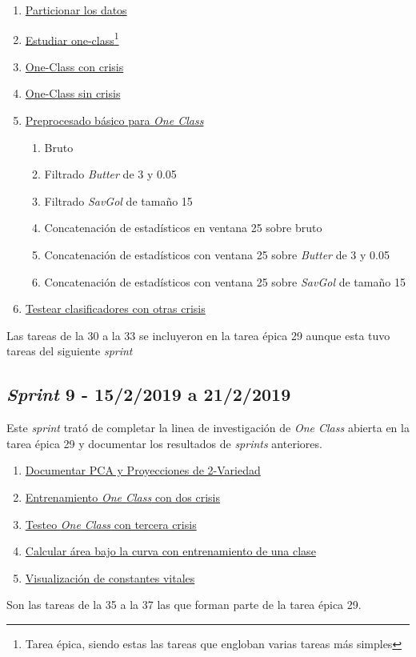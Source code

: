 \begin{enumerate}\addtocounter{enumi}{27}
	\item \href{https://github.com/joselucross/TFG-SmartBeds/issues/28}{Particionar los datos}
	\item \href{https://github.com/joselucross/TFG-SmartBeds/issues/29}{Estudiar one-class\footnote{Tarea épica, siendo estas las tareas que engloban varias tareas más simples}}
	\item \href{https://github.com/joselucross/TFG-SmartBeds/issues/30}{One-Class con crisis}
	\item \href{https://github.com/joselucross/TFG-SmartBeds/issues/31}{One-Class sin crisis}
	\item \href{https://github.com/joselucross/TFG-SmartBeds/issues/32}{Preprocesado básico para \textit{One Class}}
	\begin{enumerate}
		\item Bruto
		\item Filtrado \textit{Butter} de 3 y 0.05
		\item Filtrado \textit{SavGol} de tamaño 15
		\item Concatenación de estadísticos en ventana 25 sobre bruto
		\item Concatenación de estadísticos con ventana 25 sobre \textit{Butter} de 3 y 0.05
		\item Concatenación de estadísticos con ventana 25 sobre \textit{SavGol} de tamaño 15
	\end{enumerate}
	\item \href{https://github.com/joselucross/TFG-SmartBeds/issues/33}{Testear clasificadores con otras crisis}
\end{enumerate}
Las tareas de la 30 a la 33 se incluyeron en la tarea épica 29 aunque esta tuvo tareas del siguiente \textit{sprint}

\subsection{\textit{Sprint} 9 - 15/2/2019 a 21/2/2019}
Este \textit{sprint} trató de completar la linea de investigación de \textit{One Class} abierta en la tarea épica 29 y documentar los resultados de \textit{sprints} anteriores. 

\begin{enumerate}\addtocounter{enumi}{33}
	\item
	\href{https://github.com/joselucross/TFG-SmartBeds/issues/34}{Documentar PCA y Proyecciones de 2-Variedad}
	\item
	\href{https://github.com/joselucross/TFG-SmartBeds/issues/35}{Entrenamiento \textit{One Class} con dos crisis}
	\item
	\href{https://github.com/joselucross/TFG-SmartBeds/issues/36}{Testeo \textit{One Class} con tercera crisis}
	\item
	\href{https://github.com/joselucross/TFG-SmartBeds/issues/37}{Calcular área bajo la curva con entrenamiento de una clase}
	\item
	\href{https://github.com/joselucross/TFG-SmartBeds/issues/38}{Visualización de constantes vitales}
\end{enumerate}
Son las tareas de la 35 a la 37 las que forman parte de la tarea épica 29.
